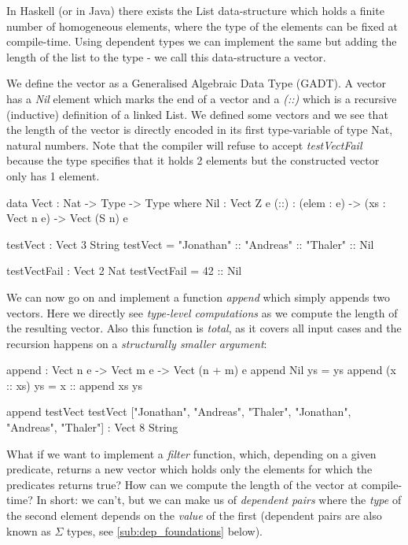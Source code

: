 In Haskell (or in Java) there exists the List data-structure which holds a finite number of homogeneous elements, where the type of the elements can be fixed at compile-time. Using dependent types we can implement the same but adding the length of the list to the type - we call this data-structure a vector.

We define the vector as a Generalised Algebraic Data Type (GADT). A vector has a \textit{Nil} element which marks the end of a vector and a \textit{(::)} which is a recursive (inductive) definition of a linked List. We defined some vectors and we see that the length of the vector is directly encoded in its first type-variable of type Nat, natural numbers. Note that the compiler will refuse to accept \textit{testVectFail} because the type specifies that it holds 2 elements but the constructed vector only has 1 element.

\begin{HaskellCode}
data Vect : Nat -> Type -> Type where
	Nil  : Vect Z e
	(::) : (elem : e) -> (xs : Vect n e) -> Vect (S n) e
	
testVect : Vect 3 String
testVect = "Jonathan" :: "Andreas" :: "Thaler" :: Nil

testVectFail : Vect 2 Nat
testVectFail = 42 :: Nil
\end{HaskellCode}

We can now go on and implement a function \textit{append} which simply appends two vectors. Here we directly see \textit{type-level computations} as we compute the length of the resulting vector. Also this function is \textit{total}, as it covers all input cases and the recursion happens on a \textit{structurally smaller argument}:

\begin{HaskellCode}
append : Vect n e -> Vect m e -> Vect (n + m) e
append Nil ys = ys
append (x :: xs) ys = x :: append xs ys

append testVect testVect
["Jonathan", "Andreas", "Thaler", "Jonathan", "Andreas", "Thaler"] : Vect 8 String
\end{HaskellCode}

What if we want to implement a \textit{filter} function, which, depending on a given predicate, returns a new vector which holds only the elements for which the predicates returns true? How can we compute the length of the vector at compile-time? In short: we can't, but we can make us of \textit{dependent pairs} where the \textit{type} of the second element depends on the \textit{value} of the first (dependent pairs are also known as $\Sigma$ types, see \ref{sub:dep_foundations} below).

